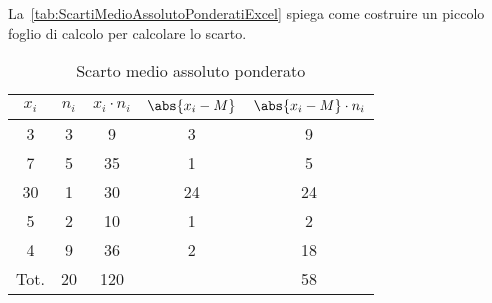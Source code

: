 La~\vref{tab:ScartiMedioAssolutoPonderatiExcel} spiega come costruire un piccolo foglio di calcolo per calcolare lo scarto.
\begin{table}
	\centering
	\begin{tabular}{*{2} {S[table-format=2.0]}S[table-format=3.0]*{2} {S[table-format=2.0]}}
	\toprule
	{$x_{i}$}&{$n_{i}$} &{$x_{i}\cdot n_{i}$}  &{$\abs{x_{i}-M}$}  &{$\abs{x_{i}-M}\cdot n_{i} $}  \\
			& 3 &9  & 3 &  9\\ 
	7		& 5 & 35 & 1 &  5\\ 
	30		&  1& 30 &  24&  24\\ 
	5		& 2 & 10 &  1&  2 \\ 
	4		& 9 & 36 &  2& 18 \\
	\midrule 
	{Tot.}&  20& 120 &  & 58 \\
	\bottomrule 
	\end{tabular} 
	\caption{Scarto medio assoluto ponderato}
	\label{tab:ScartoMedioAssolutoPonderato}
\end{table}

